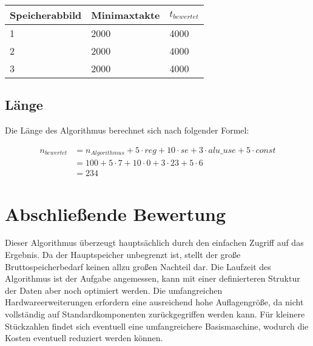 \begin{center}
    \begin{tabular}{|l|l|l|}
        \hline
        Speicherabbild & Minimaxtakte & $t_{bewertet}$ \\
        \hline
        \hline
        1 & 2000 & 4000 \\
        \hline
        2 & 2000 & 4000 \\
        \hline
        3 & 2000 & 4000 \\
        \hline
    \end{tabular}
\end{center}

\subsection{Länge}
\label{subsection:Dokumentation-BenchmarkBewertung-Berechnung-Laenge}

Die Länge des Algorithmus berechnet sich nach folgender Formel:

\begin{align*}
    n_{bewertet} &= n_{Algorithmus} + 5 \cdot reg + 10 \cdot se + 3 \cdot alu\_use + 5 \cdot const \\
                 &= 100 + 5 \cdot 7 + 10 \cdot 0 + 3 \cdot 23 + 5 \cdot 6 \\
                 &= 234
\end{align*}

\section{Abschließende Bewertung}
\label{section:Dokumentation-BenchmarkBewertung-Bewertung}

Dieser Algorithmus überzeugt hauptsächlich durch den einfachen Zugriff auf das Ergebnis. Da der Hauptspeicher unbegrenzt ist, stellt der große Bruttospeicherbedarf keinen allzu großen Nachteil dar. Die Laufzeit des Algorithmus ist der Aufgabe angemessen, kann mit einer definierteren Struktur der Daten aber noch optimiert werden. Die umfangreichen Hardwareerweiterungen erfordern eine ausreichend hohe Auflagengröße, da nicht vollständig auf Standardkomponenten zurückgegriffen werden kann. Für kleinere Stückzahlen findet sich eventuell eine umfangreichere Basismaschine, wodurch die Kosten eventuell reduziert werden können.
